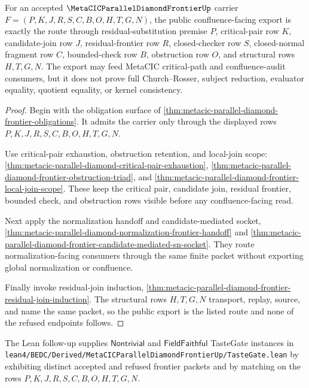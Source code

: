 \begin{theorem}
\label{thm:metacic-parallel-diamond-frontier-public-export}
For an accepted $\MetaCICParallelDiamondFrontierUp$ carrier $F=(P,K,J,R,S,C,B,O,H,T,G,N)$, the public confluence-facing export is exactly the route through residual-substitution premise $P$, critical-pair row $K$, candidate-join row $J$, residual-frontier row $R$, closed-checker row $S$, closed-normal fragment row $C$, bounded-check row $B$, obstruction row $O$, and structural rows $H,T,G,N$. The export may feed MetaCIC critical-path and confluence-audit consumers, but it does not prove full Church--Rosser, subject reduction, evaluator equality, quotient equality, or kernel consistency.
\end{theorem}
\begin{proof}
Begin with the obligation surface of \autoref{thm:metacic-parallel-diamond-frontier-obligations}. It admits the carrier only through the displayed rows $P,K,J,R,S,C,B,O,H,T,G,N$.

Use critical-pair exhaustion, obstruction retention, and local-join scope: \autoref{thm:metacic-parallel-diamond-critical-pair-exhaustion}, \autoref{thm:metacic-parallel-diamond-frontier-obstruction-triad}, and \autoref{thm:metacic-parallel-diamond-frontier-local-join-scope}. These keep the critical pair, candidate join, residual frontier, bounded check, and obstruction rows visible before any confluence-facing read.

Next apply the normalization handoff and candidate-mediated socket, \autoref{thm:metacic-parallel-diamond-normalization-frontier-handoff} and \autoref{thm:metacic-parallel-diamond-frontier-candidate-mediated-sn-socket}. They route normalization-facing consumers through the same finite packet without exporting global normalization or confluence.

Finally invoke residual-join induction, \autoref{thm:metacic-parallel-diamond-frontier-residual-join-induction}. The structural rows $H,T,G,N$ transport, replay, source, and name the same packet, so the public export is the listed route and none of the refused endpoints follows.
\end{proof}

The Lean follow-up supplies $\mathsf{Nontrivial}$ and $\mathsf{FieldFaithful}$ TasteGate instances in \texttt{lean4/BEDC/Derived/MetaCICParallelDiamondFrontierUp/TasteGate.lean} by exhibiting distinct accepted and refused frontier packets and by matching on the rows $P,K,J,R,S,C,B,O,H,T,G,N$.

